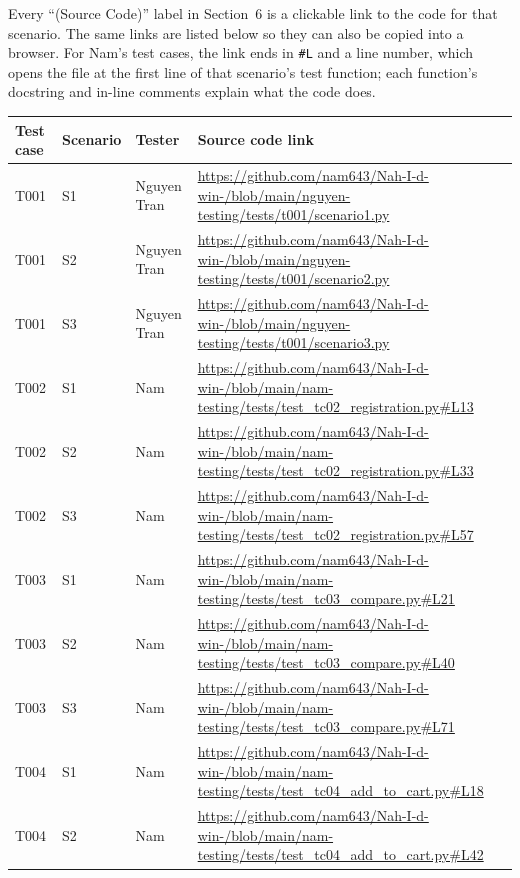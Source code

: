 \documentclass[11pt,a4paper]{article}
\begin{document}
Every ``(Source Code)'' label in Section~6 is a clickable link to the code for that scenario. The same links are listed below so they can also be copied into a browser. For Nam's test cases, the link ends in \texttt{\#L} and a line number, which opens the file at the first line of that scenario's test function; each function's docstring and in-line comments explain what the code does.

{\renewcommand{\arraystretch}{1.3}
\begin{longtable}{|L{1.3cm}|L{1.4cm}|L{2.1cm}|L{10.6cm}|}
\hline
{}\textbf{Test case} & \textbf{Scenario} & \textbf{Tester} & \textbf{Source code link} \\ \hline
\endhead
T001 & S1 & Nguyen Tran & \url{https://github.com/nam643/Nah-I-d-win-/blob/main/nguyen-testing/tests/t001/scenario1.py} \\ \hline
T001 & S2 & Nguyen Tran & \url{https://github.com/nam643/Nah-I-d-win-/blob/main/nguyen-testing/tests/t001/scenario2.py} \\ \hline
T001 & S3 & Nguyen Tran & \url{https://github.com/nam643/Nah-I-d-win-/blob/main/nguyen-testing/tests/t001/scenario3.py} \\ \hline
T002 & S1 & Nam & \url{https://github.com/nam643/Nah-I-d-win-/blob/main/nam-testing/tests/test_tc02_registration.py#L13} \\ \hline
T002 & S2 & Nam & \url{https://github.com/nam643/Nah-I-d-win-/blob/main/nam-testing/tests/test_tc02_registration.py#L33} \\ \hline
T002 & S3 & Nam & \url{https://github.com/nam643/Nah-I-d-win-/blob/main/nam-testing/tests/test_tc02_registration.py#L57} \\ \hline
T003 & S1 & Nam & \url{https://github.com/nam643/Nah-I-d-win-/blob/main/nam-testing/tests/test_tc03_compare.py#L21} \\ \hline
T003 & S2 & Nam & \url{https://github.com/nam643/Nah-I-d-win-/blob/main/nam-testing/tests/test_tc03_compare.py#L40} \\ \hline
T003 & S3 & Nam & \url{https://github.com/nam643/Nah-I-d-win-/blob/main/nam-testing/tests/test_tc03_compare.py#L71} \\ \hline
T004 & S1 & Nam & \url{https://github.com/nam643/Nah-I-d-win-/blob/main/nam-testing/tests/test_tc04_add_to_cart.py#L18} \\ \hline
T004 & S2 & Nam & \url{https://github.com/nam643/Nah-I-d-win-/blob/main/nam-testing/tests/test_tc04_add_to_cart.py#L42} \\ \hline

\end{longtable}}
\end{document}
